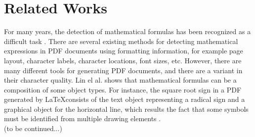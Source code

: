 \section{Related Works}
For many years, the detection of mathematical formulas has been recognized as a difficult task \cite{Chan2000}. There are several existing methods for detecting mathematical expressions in PDF documents using formatting information, for example page layout, character labels, character locations, font sizes, etc.  However, there are many different tools for generating PDF documents, and there are a variant in their character quality. Lin el al. \cite{Lin2011} shows that mathematical formulas can be a composition of some object types. For instance, the square root sign in a PDF generated by \LaTeX consists of the text object representing a radical sign and a graphical object for the horizontal line, which results the fact that some symbols must be identified from multiple drawing elements \cite{Mali2020}. \\
(to be continued...)